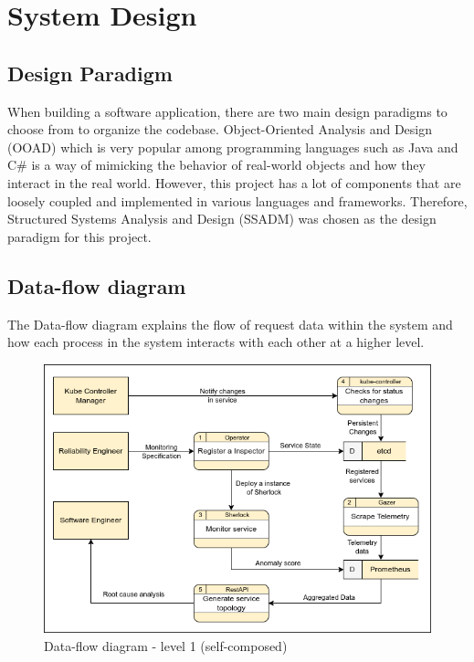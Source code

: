 \section{System Design}

\subsection{Design Paradigm}

When building a software application, there are two main design paradigms to choose from to organize the codebase. Object-Oriented Analysis and Design (OOAD) which is very popular among programming languages such as Java and C\# is a way of mimicking the behavior of real-world objects and how they interact in the real world. However, this project has a lot of components that are loosely coupled and implemented in various languages and frameworks. Therefore, Structured Systems Analysis and Design (SSADM) was chosen as the design paradigm for this project.

\subsection{Data-flow diagram}

The Data-flow diagram explains the flow of request data within the system and how each process in the system interacts with each other at a higher level.

\begin{figure}[H]
    \includegraphics[width=12cm]{assets/system-design/data-flow-level-1.png}
    \caption{Data-flow diagram - level 1 (self-composed)}
\end{figure}

